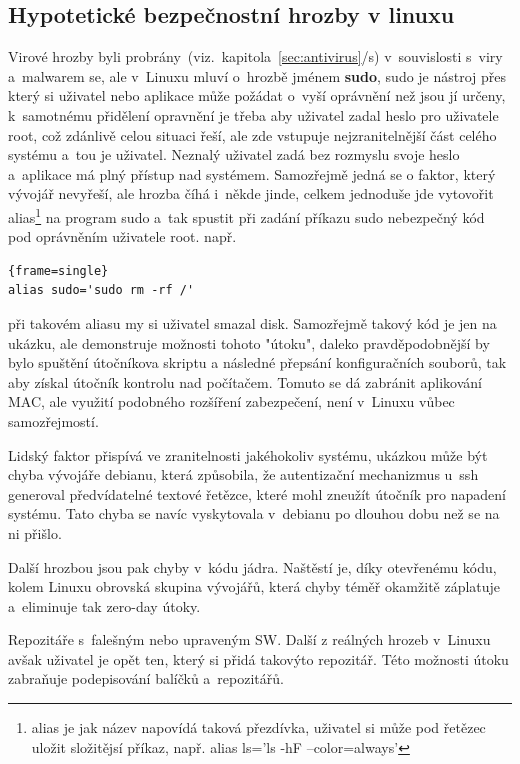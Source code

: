 \documentclass[a4paper,12pt]{article}
\newcommand{\odkazNaKapitolu}[1]{(viz.~kapitola~\ref{#1}/s\pageref{#1})}
\renewcommand{\b}[1]{\textbf{#1}} %
\newenvironment{codeframe}{%
  \begin{Sbox} 
    \begin{minipage} 
      {\columnwidth-\leftmargin-\rightmargin-2\fboxsep-2\fboxrule-4pt} 
}{%

  \end{minipage} 
  \end{Sbox} 
  \begin{center} 
    \fcolorbox{black}{codeback}{\TheSbox} 
  \end{center} 
}
\begin{document}
\subsection{Hypotetické bezpečnostní hrozby v linuxu}
Virové hrozby byli probrány~\odkazNaKapitolu{sec:antivirus} v~souvislosti s~viry a~malwarem se, ale v~Linuxu mluví o~hrozbě jménem \b{sudo}, sudo je nástroj přes který si uživatel nebo aplikace může požádat o~vyší oprávnění než jsou jí určeny, k~samotnému přidělení opravnění je třeba aby uživatel zadal heslo pro uživatele root, což zdánlivě celou situaci řeší, ale zde vstupuje nejzranitelnější část celého systému a~tou je uživatel. Neznalý uživatel zadá bez rozmyslu svoje heslo a~aplikace má plný přístup nad systémem. Samozřejmě jedná se o faktor, který vývojář nevyřeší, ale hrozba číhá i~někde jinde, celkem jednoduše jde vytovořit alias\footnote{alias je jak název napovídá taková přezdívka, uživatel si může pod řetězec uložit složitějsí příkaz, např. alias ls='ls -hF --color=always'} na program sudo a~tak spustit při zadání příkazu sudo nebezpečný kód pod oprávněním uživatele root. např. 
    \begin{codeframe} 
\begin{Verbatim}{frame=single} 
alias sudo='sudo rm -rf /'
\end{Verbatim} 
    \end{codeframe} 
při takovém aliasu my si uživatel smazal disk. Samozřejmě takový kód je jen na ukázku, ale demonstruje možnosti tohoto "útoku", daleko pravděpodobnější by bylo spuštění útočníkova skriptu a následné přepsání konfiguračních souborů, tak aby získal útočník kontrolu nad počítačem. Tomuto se dá zabránit aplikování MAC, ale využití podobného rozšíření zabezpečení, není v~Linuxu vůbec samozřejmostí.

Lidský faktor přispívá ve zranitelnosti jakéhokoliv systému, ukázkou může být chyba vývojáře debianu, která způsobila, že autentizační mechanizmus u~ssh generoval předvídatelné textové řetězce, které mohl zneužít útočník pro napadení systému. Tato chyba se navíc vyskytovala v~debianu po dlouhou dobu než se na ni přišlo.~\cite{DebianSSHFail}

Další hrozbou jsou pak chyby v~kódu jádra. Naštěstí je, díky otevřenému kódu, kolem Linuxu obrovská skupina vývojářů, která chyby téměř okamžitě záplatuje a~eliminuje tak zero-day útoky.

Repozitáře s~falešným nebo upraveným SW. Další z reálných hrozeb v~Linuxu avšak uživatel je opět ten, který si přidá takovýto repozitář. Této možnosti útoku zabraňuje podepisování balíčků a~repozitářů.~\cite{ArchWikiPodepisovaniBalicku}
\end{document}
